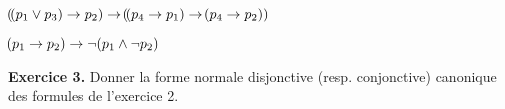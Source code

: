 \documentclass[a4paper,french,bookmarks]{book}
\begin{document}
\begin{enumerate}
\begin{minipage}[t]{0.48\linewidth}
            
            \item $\!\left(\!\left(p_1 \lor p_3\right) \rightarrow p_2\right) \rightarrow \!\left(\!\left(p_4 \rightarrow p_1\right) \rightarrow \!\left(p_4 \rightarrow p_2\right)\right)$
            
            
            \item $\!\left(p_1 \rightarrow p_2\right) \rightarrow \neg\!\left(p_1 \land \neg p_2\right)$
            
        \end{minipage}
        
    \end{enumerate}
    
    \textbf{Exercice 3.} Donner la forme normale disjonctive (resp. conjonctive) canonique des formules de l'exercice 2.
    
\end{document}
